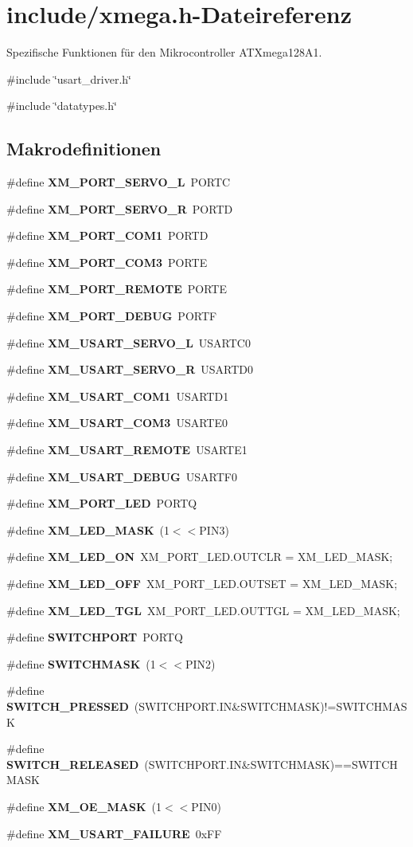 \section{include/xmega.h-\/Dateireferenz}
\label{xmega_8h}


Spezifische Funktionen für den Mikrocontroller ATXmega128A1.  


{\ttfamily \#include \char`\"{}usart\_\-driver.h\char`\"{}}\par
{\ttfamily \#include \char`\"{}datatypes.h\char`\"{}}\par
\subsection*{Makrodefinitionen}
\begin{DoxyCompactItemize}
\item 
\#define {\bf XM\_\-PORT\_\-SERVO\_\-L}~PORTC
\item 
\#define {\bf XM\_\-PORT\_\-SERVO\_\-R}~PORTD
\item 
\#define {\bf XM\_\-PORT\_\-COM1}~PORTD
\item 
\#define {\bf XM\_\-PORT\_\-COM3}~PORTE
\item 
\#define {\bf XM\_\-PORT\_\-REMOTE}~PORTE
\item 
\#define {\bf XM\_\-PORT\_\-DEBUG}~PORTF
\item 
\#define {\bf XM\_\-USART\_\-SERVO\_\-L}~USARTC0
\item 
\#define {\bf XM\_\-USART\_\-SERVO\_\-R}~USARTD0
\item 
\#define {\bf XM\_\-USART\_\-COM1}~USARTD1
\item 
\#define {\bf XM\_\-USART\_\-COM3}~USARTE0
\item 
\#define {\bf XM\_\-USART\_\-REMOTE}~USARTE1
\item 
\#define {\bf XM\_\-USART\_\-DEBUG}~USARTF0
\item 
\#define {\bf XM\_\-PORT\_\-LED}~PORTQ
\item 
\#define {\bf XM\_\-LED\_\-MASK}~(1$<$$<$PIN3)
\item 
\#define {\bf XM\_\-LED\_\-ON}~XM\_\-PORT\_\-LED.OUTCLR = XM\_\-LED\_\-MASK;
\item 
\#define {\bf XM\_\-LED\_\-OFF}~XM\_\-PORT\_\-LED.OUTSET = XM\_\-LED\_\-MASK;
\item 
\#define {\bf XM\_\-LED\_\-TGL}~XM\_\-PORT\_\-LED.OUTTGL = XM\_\-LED\_\-MASK;
\item 
\#define {\bf SWITCHPORT}~PORTQ
\item 
\#define {\bf SWITCHMASK}~(1$<$$<$PIN2)
\item 
\#define {\bf SWITCH\_\-PRESSED}~(SWITCHPORT.IN\&SWITCHMASK)!=SWITCHMASK
\item 
\#define {\bf SWITCH\_\-RELEASED}~(SWITCHPORT.IN\&SWITCHMASK)==SWITCHMASK
\item 
\#define {\bf XM\_\-OE\_\-MASK}~(1$<$$<$PIN0)
\item 
\#define {\bf XM\_\-USART\_\-FAILURE}~0xFF
\end{DoxyCompactItemize}
